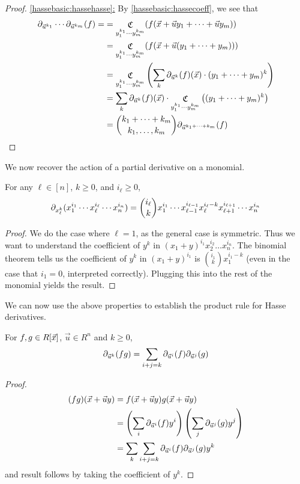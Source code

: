\documentclass[letterpaper,11pt]{article}
\numberwithin{equation}{section}
\theoremstyle{plain}
\theoremstyle{remark}
\DeclareMathOperator{\coeffo}{\mathfrak{C}}
\newcommand{\coeff}[1]{\coeffo_{#1}}
\begin{document}
\begin{proof}
	\uline{\eqref{hassebasic:hassehasse}:} By \eqref{hassebasic:hassecoeff}, we see that
	\begin{align*}
		\hasse_{\vec{u}^{k_1}}\cdots\hasse_{\vec{u}^{k_m}}(f)=
		&=\coeff{y_1^{k_1}\cdots y_m^{k_m}}(f(\vec{x}+\vec{u}y_1+\cdots+\vec{u}y_m))\\
		&=\coeff{y_1^{k_1}\cdots y_m^{k_m}}(f(\vec{x}+\vec{u}(y_1+\cdots+y_m)))\\
		&=\coeff{y_1^{k_1}\cdots y_m^{k_m}}\left(\sum_{k}\hasseu(f)(\vec{x})\cdot(y_1+\cdots+y_m)^k\right)\\
		&=\sum_{k}\hasseu(f)(\vec{x})\cdot\coeff{y_1^{k_1}\cdots y_m^{k_m}}\left((y_1+\cdots+y_m)^k\right)\\
		&=\binom{k_1+\cdots+k_m}{k_1,\ldots,k_m}\hasse_{\vec{u}^{k_1+\cdots+k_m}}(f)
		\qedhere
	\end{align*}
\end{proof}

We now recover the action of a partial derivative on a monomial.

\begin{lemma}
	\label{hassemonomial}
	For any $\ell\in[n]$, $k\ge 0$, and $i_\ell\ge 0$,
		\[
		\partial_{x_\ell^k}(x_1^{i_1}\cdots x_\ell^{i_\ell}\cdots x_n^{i_n})
		=
		\binom{i_\ell}{k} x_1^{i_1}\cdots x_{\ell-1}^{i_{\ell-1}}x_\ell^{i_\ell-k}x_{\ell+1}^{i_{\ell+1}}\cdots x_n^{i_n}
		\]
\end{lemma}
\begin{proof}
	We do the case where $\ell=1$, as the general case is symmetric.  Thus we want to understand the coefficient of $y^k$ in $(x_1+y)^{i_1}x_2^{i_2}\ldots x_n^{i_n}$. The binomial theorem tells us the coefficient of $y^k$ in $(x_1+y)^{i_1}$ is $\binom{i_1}{k}x_1^{i_1-k}$ (even in the case that $i_1=0$, interpreted correctly).  Plugging this into the rest of the monomial yields the result.
\end{proof}

We can now use the above properties to establish the product rule for Hasse derivatives.

\begin{lemma}
	For $f,g\in R[\vec{x}]$, $\vec{u}\in R^n$ and $k\ge 0$, \[\partial_{\vec{u}^k}(fg)=\sum_{i+j=k}\partial_{\vec{u}^i}(f)\partial_{\vec{u}^j}(g)\]
\end{lemma}
\begin{proof}
	\begin{align*}
		(fg)(\vec{x}+\vec{u}y)
		&=f(\vec{x}+\vec{u}y)g(\vec{x}+\vec{u}y)\\
		&=\left(\sum_i \partial_{\vec{u}^i}(f)y^i\right) \left(\sum_j \partial_{\vec{u}^j}(g)y^j\right)\\
		&=\sum_k\sum_{i+j=k} \partial_{\vec{u}^i}(f)\partial_{\vec{u}^j}(g)y^k
	\end{align*}
	and result follows by taking the coefficient of $y^k$.
\end{proof}
\end{document}
